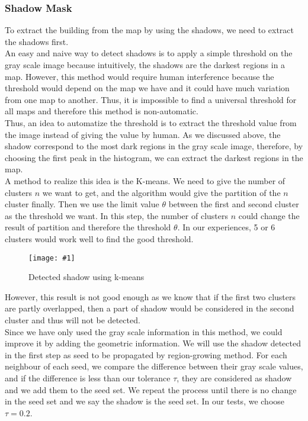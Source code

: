 \documentclass[runningheads]{llncs}
\newcommand{\insertF}[4]{
  \begin{figure}[h!]
    \centering
    \begin{minipage}{#3\linewidth}
    \texttt{[image: \#1]}
    \end{minipage}  
      \caption{#2}
      \label{#4}
  \end{figure}  
}
\begin{document}
\subsubsection{Shadow Mask}
To extract the building from the map by using the shadows, we need to extract the shadows first. \\
An easy and naive way to detect shadows is to apply a simple threshold on the gray scale image because intuitively, the shadows are the darkest regions in a map. However, this method would require human interference because the threshold would depend on the map we have and it could have much variation from one map to another. Thus, it is impossible to find a universal threshold for all maps and therefore this method is non-automatic.\\
Thus, an idea to automatize the threshold is to extract the threshold value from the image instead of giving the value by human. As we discussed above, the shadow correspond to the most dark regions in the gray scale image, therefore, by choosing the first peak in the histogram, we can extract the darkest regions in the map. \\
A method to realize this idea is the K-means. We need to give the number of clusters $n$ we want to get, and the algorithm would give the partition of the $n$ cluster finally. Then we use the limit value $\theta$ between the first and second cluster as the threshold we want. In this step, the number of clusters $n$ could change the result of partition and therefore the threshold $\theta$. In our experiences, 5 or 6 clusters would work well to find the good threshold.\\
\insertF{shadow_kmeans}{Detected shadow using k-means}{0.5}{1}
\FloatBarrier
However, this result is not good enough as we know that if the first two clusters are partly overlapped, then a part of shadow would be considered in the second cluster and thus will not be detected.\\ 
Since we have only used the gray scale information in this method, we could improve it by adding the geometric information. We will use the shadow detected in the first step as seed to be propagated by region-growing method. For each neighbour of each seed, we compare the difference between their gray scale values, and if the difference is less than our tolerance $\tau$, they are considered as shadow and we add them to the seed set. We repeat the process until there is no change in the seed set and we say the shadow is the seed set. In our tests, we choose $\tau =0.2$.\\
\end{document}
